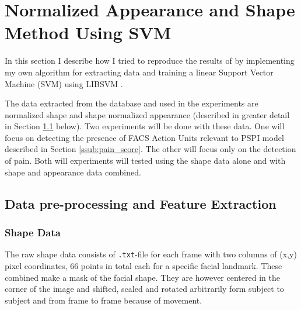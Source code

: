 \documentclass[Main]{subfiles}
\begin{document}
\section{Normalized Appearance and Shape Method Using SVM} %
	\label{sec:normalized_appearance_and_shape_method_using_svm}
	In this section I describe how I tried to reproduce the results of \cite{Lucey2011} by implementing my own algorithm for extracting data and training a linear Support Vector Machine (SVM) using LIBSVM \cite{CC01a}.

	The data extracted from the database and used in the experiments are normalized shape and shape normalized appearance (described in greater detail in Section \ref{sub:data_pre_processing_and_feature_extraction} below).
	Two experiments will be done with these data.
	One will focus on detecting the presence of FACS Action Units relevant to PSPI model described in Section \ref{ssub:pain_score}.
	The other will focus only on the detection of pain.
	Both will experiments will tested using the shape data alone and with shape and appearance data combined.




	\subsection{Data pre-processing and Feature Extraction} %
		\label{sub:data_pre_processing_and_feature_extraction}

		\subsubsection{Shape Data} %
			\label{ssub:shape_data}
			The raw shape data consists of \texttt{.txt}-file for each frame with two columns of (x,y) pixel coordinates, 66 points in total each for a specific facial landmark.
			These combined make a mask of the facial shape.
			They are however centered in the corner of the image and shifted, scaled and rotated arbitrarily form subject to subject and from frame to frame because of movement.
\end{document}
